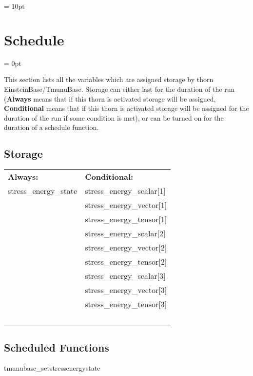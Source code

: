 \documentclass{article}
\begin{document}
\vspace{5mm}\parskip = 10pt 

\section{Schedule} 


\parskip = 0pt


\noindent This section lists all the variables which are assigned storage by thorn EinsteinBase/TmunuBase.  Storage can either last for the duration of the run ({\bf Always} means that if this thorn is activated storage will be assigned, {\bf Conditional} means that if this thorn is activated storage will be assigned for the duration of the run if some condition is met), or can be turned on for the duration of a schedule function.


\subsection*{Storage}

\hspace{5mm}

 \begin{tabular*}{160mm}{ll} 

{\bf Always:}& {\bf Conditional:} \\ 
 stress\_energy\_state &  stress\_energy\_scalar[1]\\ 
~ &  stress\_energy\_vector[1]\\ 
~ &  stress\_energy\_tensor[1]\\ 
~ &  stress\_energy\_scalar[2]\\ 
~ &  stress\_energy\_vector[2]\\ 
~ &  stress\_energy\_tensor[2]\\ 
~ &  stress\_energy\_scalar[3]\\ 
~ &  stress\_energy\_vector[3]\\ 
~ &  stress\_energy\_tensor[3]\\ 
~ & ~\\ 
\end{tabular*} 


\subsection*{Scheduled Functions}
\vspace{5mm}


\hspace{5mm} tmunubase\_setstressenergystate 
\end{document}
